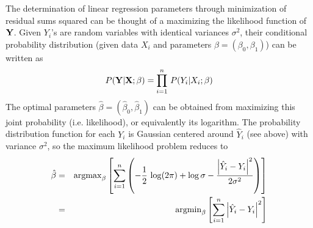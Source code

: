 \documentclass[aps,prl,preprint,superscriptaddress]{revtex4-1}
\begin{document}
The determination of linear regression parameters through minimization of residual sums squared can be
thought of a maximizing the likelihood function of ${\bf Y}$. Given $Y_i$'s are random variables
with identical variances $\sigma^2$, their conditional probability distribution (given
data $X_i$ and parameters $\beta = (\beta_0, \beta_1)$) can be written as
%
\begin{equation}
P({\bf Y} | {\bf X}; \beta) = \prod_{i=1}^n\, P(Y_i | X_i; \beta)
\end{equation}
%
The optimal parameters ${\hat \beta} = ({\hat \beta}_0, {\hat \beta}_1)$ can be obtained from maximizing this
joint probability (i.e. likelihood), or equivalently its logarithm. The probability distribution 
function for each $Y_i$ is Gaussian centered around ${\hat Y}_i$ (see above) with variance $\sigma^2$,
so the maximum likelihood problem reduces to
%
\begin{eqnarray}
{\hat \beta} &=& {\rm argmax}_{\beta} \left[ \sum_{i=1}^n \left(-\frac{1}{2}\, \log(2\pi) + \log \sigma - 
                                             \frac{\left\vert {\hat Y}_i - Y_i \right\vert^2}{2 \sigma^2} \right) \right] \nonumber\\
             &=& {\rm argmin}_{\beta} \left[ \sum_{i=1}^n \left\vert {\hat Y}_i - Y_i \right\vert^2 \right] 
\end{eqnarray}
%
\end{document}
